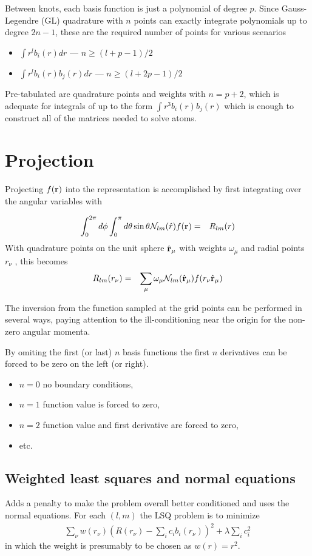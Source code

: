 \documentclass[12pt]{article}
\newcommand{\N}{\mathcal{N}}
\newcommand{\rv}{\vb{r}}
\newcommand{\rhat}{\hat{\rv}}
\begin{document}
Between knots, each basis function is just a polynomial of degree $p$.  Since Gauss-Legendre (GL) quadrature with $n$ points can exactly integrate polynomials up to degree $2n-1$, these are the required number of points for various scenarios
\begin{itemize}
\item $\int r^l b_i(r) dr$ --- $n \ge (l+p-1)/2$
\item $\int r^l b_i(r) b_j(r) dr$ --- $n \ge (l+2p-1)/2$
\end{itemize}
Pre-tabulated are quadrature points and weights with $n=p+2$, which is adequate for integrals of up to the form $\int r^3 b_i(r) b_j(r)$ which is enough to construct all of the matrices needed to solve atoms.

\section{Projection}

Projecting $f(\vb{r})$ into the representation is accomplished by first integrating over the angular variables with

\begin{eqnarray}
  \int_0^{2 \pi} d\phi \int_0^\pi d\theta \sin \theta  \N_{lm} (\hat{r}) f(\vb{r}) & = & R_{lm}(r) 
\end{eqnarray}
With quadrature points on the unit sphere $\rhat_\mu$ with
weights $\omega_\mu$ and radial points $r_\nu$ , this becomes
\begin{eqnarray}
  R_{lm}(r_\nu) & = & \sum_\mu \omega_\mu \N_{lm} (\rhat_\mu) f(r_\nu \rhat_\mu)
\end{eqnarray}

The inversion from the function sampled at the grid points can be performed in several ways, paying attention to the ill-conditioning near the origin for the non-zero angular momenta.

By omiting the first (or last) $n$ basis functions the first $n$ derivatives can be forced to be zero on the left (or right).  
\begin{itemize}
\item $n=0$ no boundary conditions,
\item $n=1$ function value is forced to zero,
\item $n=2$ function value and first derivative are forced to zero,
\item etc.
\end{itemize}

\subsection{Weighted least squares and normal equations}
Adds a penalty to make the problem overall better conditioned and uses the normal equations.  For each $(l,m)$ the LSQ problem is to minimize
\begin{eqnarray}
  \sum_\nu  w(r_\nu) \left( R(r_\nu) - \sum_i c_i b_i(r_\nu) \right)^2 + \lambda \sum_i c_i^2
\end{eqnarray}
in which the weight is presumably to be chosen as $w(r)=r^2$.
\end{document}
